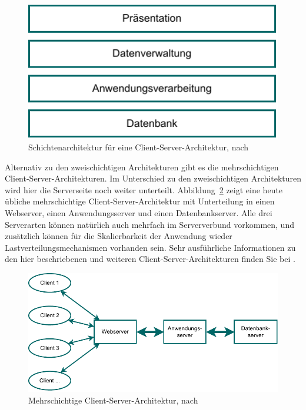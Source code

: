 \begin{figure}[h!]
	\centering
	\includegraphics{Bilder/Kapitel-7/schichtenarchitektur_fuer_client_server_architektur.pdf}
	\vspace{2mm} %
	\caption[Schichtenarchitektur für eine Client-Server-Architektur]{Schichtenarchitektur für eine Client-Server-Architektur, nach \cite[564]{som18}}
	\label{fig:schichtenarchitektur_fuer_client_server_architektur}
\end{figure}

\vspace{\baselineskip} %

Alternativ zu den zweischichtigen Architekturen gibt es die mehrschichtigen Client-Server-Architekturen. Im Unterschied zu den zweischichtigen Architekturen wird hier die Serverseite noch weiter unterteilt. Abbildung~\ref{fig:client_server_architektur_mehrschichtig} zeigt eine heute übliche mehrschichtige Client-Server-Architektur mit Unterteilung in einen Webserver, einen Anwendungsserver und einen Datenbankserver. Alle drei Serverarten können natürlich auch mehrfach im Serververbund vorkommen, und zusätzlich können für die Skalierbarkeit der Anwendung wieder Lastverteilungsmechanismen vorhanden sein. Sehr ausführliche Informationen zu den hier beschriebenen und weiteren Client-Server-Architekturen finden Sie bei \cite[562-581]{som18}.

\begin{figure}[h!]
	\centering
	\includegraphics{Bilder/Kapitel-7/client_server_architektur_mehrschichtig.pdf}
	\caption[Mehrschichtige Client-Server-Architektur]{Mehrschichtige Client-Server-Architektur, nach \cite[117]{som20}}
	\label{fig:client_server_architektur_mehrschichtig}
\end{figure}

